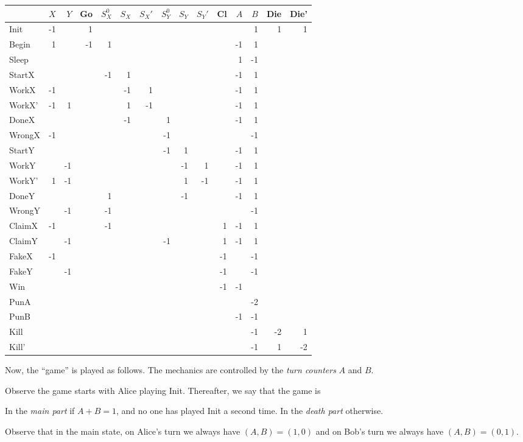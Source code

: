 \documentclass[11pt]{scrartcl}
\begin{document}
\begin{center}
\scriptsize
\setlength{\tabcolsep}{3pt}
\begin{tabular}{l|rr|r|rrr|rrr|r|rr|rr}
&$X$&$Y$&Go&$S_X^0$&$S_X$&$S_X'$&$S_Y^0$&$S_Y$&$S_Y'$&Cl&$A$&$B$&Die&Die'\\\hline
Init&-1&&1&&&&&&&&&1&1&1\\
Begin&1&&-1&1&&&&&&&-1&1&&\\\hline
Sleep&&&&&&&&&&&1&-1&&\\\hline
StartX&&&&-1&1&&&&&&-1&1&&\\
WorkX&-1&&&&-1&1&&&&&-1&1&&\\
WorkX'&-1&1&&&1&-1&&&&&-1&1&&\\
DoneX&&&&&-1&&1&&&&-1&1&&\\
WrongX&-1&&&&&&-1&&&&&-1&&\\\hline
StartY&&&&&&&-1&1&&&-1&1&&\\
WorkY&&-1&&&&&&-1&1&&-1&1&&\\
WorkY'&1&-1&&&&&&1&-1&&-1&1&&\\
DoneY&&&&1&&&&-1&&&-1&1&&\\
WrongY&&-1&&-1&&&&&&&&-1&&\\\hline
ClaimX&-1&&&-1&&&&&&1&-1&1&&\\
ClaimY&&-1&&&&&-1&&&1&-1&1&&\\
FakeX&-1&&&&&&&&&-1&&-1&&\\
FakeY&&-1&&&&&&&&-1&&-1&&\\
Win&&&&&&&&&&-1&-1&&&\\\hline
PunA&&&&&&&&&&&&-2&&\\
PunB&&&&&&&&&&&-1&-1&&\\
Kill&&&&&&&&&&&&-1&-2&1\\
Kill'&&&&&&&&&&&&-1&1&-2
\end{tabular}
\end{center}

Now, the ``game'' is played as follows.
The mechanics are controlled by the \emph{turn counters} $A$ and $B$.

Observe the game starts with Alice playing Init.
Thereafter, we say that the game is
\begin{itemize}
  \ii In the \emph{main part} if $A+B = 1$,
  and no one has played Init a second time.
  \ii In the \emph{death part} otherwise.
\end{itemize}
Observe that in the main state,
on Alice's turn we always have $(A,B) = (1,0)$
and on Bob's turn we always have $(A,B) = (0,1)$.
\end{document}
